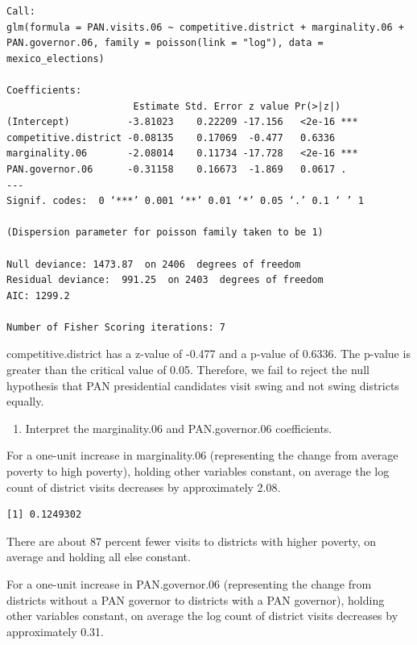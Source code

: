 \documentclass[12pt,letterpaper]{article}
\begin{document}
\begin{verbatim}
Call:
glm(formula = PAN.visits.06 ~ competitive.district + marginality.06 + 
PAN.governor.06, family = poisson(link = "log"), data = mexico_elections)

Coefficients:
                      Estimate Std. Error z value Pr(>|z|)    
(Intercept)          -3.81023    0.22209 -17.156   <2e-16 ***
competitive.district -0.08135    0.17069  -0.477   0.6336    
marginality.06       -2.08014    0.11734 -17.728   <2e-16 ***
PAN.governor.06      -0.31158    0.16673  -1.869   0.0617 .  
---
Signif. codes:  0 ‘***’ 0.001 ‘**’ 0.01 ‘*’ 0.05 ‘.’ 0.1 ‘ ’ 1

(Dispersion parameter for poisson family taken to be 1)

Null deviance: 1473.87  on 2406  degrees of freedom
Residual deviance:  991.25  on 2403  degrees of freedom
AIC: 1299.2

Number of Fisher Scoring iterations: 7
\end{verbatim}

\noindent competitive.district has a z-value of -0.477 and a p-value of 0.6336. The p-value is greater than the critical value of 0.05. Therefore, we fail to reject the null hypothesis that PAN presidential candidates visit swing and not swing districts equally.

\begin{enumerate}
	\item [(b)] Interpret the marginality.06 and PAN.governor.06 coefficients.
\end{enumerate}

\noindent For a one-unit increase in marginality.06 (representing the change from average poverty to high poverty), holding other variables constant, on average the log count of district visits decreases by approximately 2.08.



\begin{verbatim}
[1] 0.1249302
\end{verbatim}

\noindent There are about 87 percent fewer visits to districts with higher poverty, on average and holding all else constant.

\vspace{.25cm}

\noindent For a one-unit increase in PAN.governor.06 (representing the change from districts without a PAN governor to districts with a PAN governor), holding other variables constant, on average the log count of district visits decreases by approximately 0.31.
\end{document}
